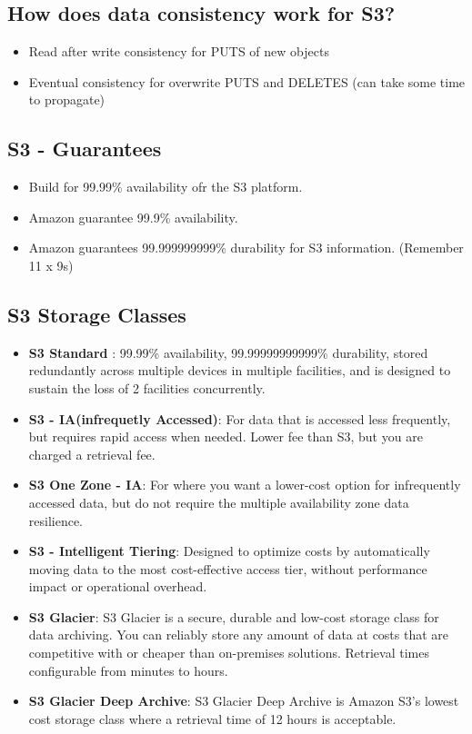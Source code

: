 \documentclass{article}
\begin{document}
	\subsection{How does data consistency work for S3?}
	\begin{itemize}
	\item
	Read after write consistency for PUTS of new objects
	
	\item
	Eventual consistency for overwrite PUTS and DELETES (can take some time to 		propagate)
	\end{itemize}
	
	\subsection{S3 - Guarantees}
	\begin{itemize}
	\item
	Build for 99.99\% availability ofr the S3 platform.
	
	\item
	Amazon guarantee 99.9\% availability.
	
	\item
	Amazon guarantees 99.999999999\% durability for S3 information. (Remember 11 x 9s)
	\end{itemize}
	
	\subsection{S3 Storage Classes}
	\begin{itemize}
	\item
	\textbf{S3 Standard} : 99.99\% availability, 99.99999999999\% durability, stored redundantly 		across multiple devices in multiple facilities, and is designed to sustain the loss of 2 	facilities concurrently.
	
	\item
	\textbf{S3 - IA(infrequetly Accessed)}: For data that is accessed less frequently, but requires rapid access when needed. Lower fee than S3, but you are charged a retrieval fee.
	
	\item
	\textbf{S3 One Zone - IA}: For where you want a lower-cost option for infrequently accessed data, but do not require the multiple availability zone data resilience.
	
	\item
	\textbf{S3 - Intelligent Tiering}: Designed to optimize costs by automatically moving data to the most cost-effective access tier, without performance impact or operational overhead.
	
	\item
	\textbf{S3 Glacier}: S3 Glacier is a secure, durable and low-cost storage class for data archiving. You can reliably store any amount of data at costs that are competitive with or cheaper than on-premises solutions. Retrieval times configurable from minutes to hours.
	
	\item
	\textbf{S3 Glacier Deep Archive}: S3 Glacier Deep Archive is Amazon S3's lowest cost storage class where a retrieval time of 12 hours is acceptable.
	\end{itemize}
	
\end{document}
